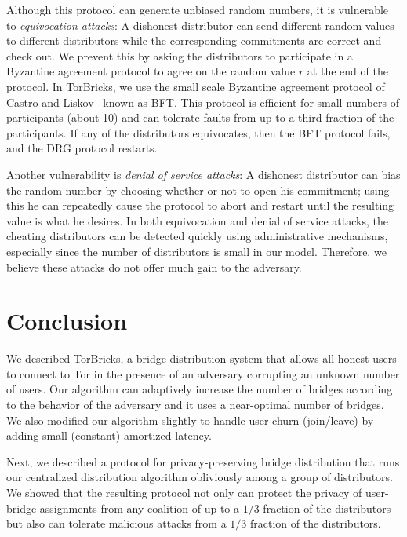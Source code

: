 \documentclass[a4paper,UKenglish]{lipics-v2016}
\newcommand{\bricks}{}
\def\bricks/{\mbox{TorBricks}}
\begin{document}
Although this protocol can generate unbiased random numbers, it is vulnerable to \emph{equivocation attacks}:
A dishonest distributor can send different random values to different distributors while the corresponding commitments are correct and check out. We prevent this by asking the distributors to participate in a Byzantine agreement protocol to agree on the random value $r$ at the end of the protocol. In \bricks/, we use the small scale Byzantine agreement protocol of Castro and Liskov~\cite{CL1} known as BFT. This protocol is efficient for small numbers of participants (about 10) and can tolerate faults from up to a third fraction of the participants. If any of the distributors equivocates, then the BFT protocol fails, and the DRG protocol restarts. 

Another vulnerability is \emph{denial of service attacks}: A dishonest distributor can bias the random number by choosing whether or not to open his commitment; using this he can repeatedly cause the protocol to abort and restart until the resulting value is what he desires. In both equivocation and denial of service attacks, the cheating distributors can be detected quickly using administrative mechanisms, especially since the number of distributors is small in our model. Therefore, we believe these attacks do not offer much gain to the adversary.

\section{Conclusion} \label{sec:conclusion}
We described \bricks/, a bridge distribution system that allows all honest users to connect to Tor in the presence of an adversary corrupting an unknown number of users. Our algorithm can adaptively increase the number of bridges according to the behavior of the adversary and it uses a near-optimal number of bridges. We also modified our algorithm slightly to handle user churn (join/leave) by adding small (constant) amortized latency.

Next, we described a protocol for privacy-preserving bridge distribution that runs our centralized distribution algorithm obliviously among a group of distributors. We showed that the resulting protocol not only can protect the privacy of user-bridge assignments from any coalition of up to a $1/3$ fraction of the distributors but also can tolerate malicious attacks from a $1/3$ fraction of the distributors. %
\end{document}
